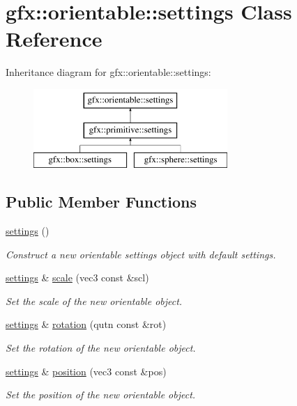 \hypertarget{classgfx_1_1orientable_1_1settings}{\section{gfx\-:\-:orientable\-:\-:settings Class Reference}
\label{classgfx_1_1orientable_1_1settings}
}
Inheritance diagram for gfx\-:\-:orientable\-:\-:settings\-:\begin{figure}[H]
\begin{center}
\leavevmode
\includegraphics[height=3.000000cm]{classgfx_1_1orientable_1_1settings}
\end{center}
\end{figure}
\subsection*{Public Member Functions}
\begin{DoxyCompactItemize}
\item 
\hyperlink{classgfx_1_1orientable_1_1settings_a72c07898699dfd2fcf2b676c20e36bf2}{settings} ()
\begin{DoxyCompactList}\small\item\em Construct a new orientable settings object with default settings. \end{DoxyCompactList}\item 
\hyperlink{classgfx_1_1orientable_1_1settings}{settings} \& \hyperlink{classgfx_1_1orientable_1_1settings_a6189fb0883df1f88c7812c9b4482c288}{scale} (vec3 const \&scl)
\begin{DoxyCompactList}\small\item\em Set the scale of the new orientable object. \end{DoxyCompactList}\item 
\hyperlink{classgfx_1_1orientable_1_1settings}{settings} \& \hyperlink{classgfx_1_1orientable_1_1settings_aba172ea4027c4070c14744b559f35206}{rotation} (qutn const \&rot)
\begin{DoxyCompactList}\small\item\em Set the rotation of the new orientable object. \end{DoxyCompactList}\item 
\hyperlink{classgfx_1_1orientable_1_1settings}{settings} \& \hyperlink{classgfx_1_1orientable_1_1settings_ae2ab56c929f64eef22a6f8cd373ac4e3}{position} (vec3 const \&pos)
\begin{DoxyCompactList}\small\item\em Set the position of the new orientable object. \end{DoxyCompactList}\end{DoxyCompactItemize}
